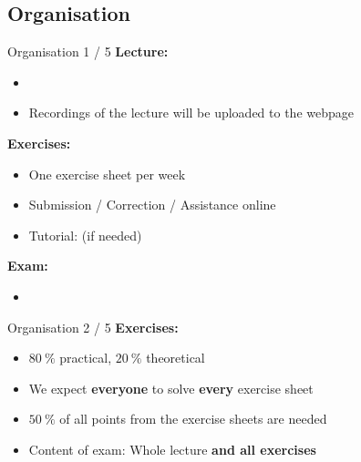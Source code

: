 \subsection{Organisation}

\begin{frame}{Organisation 1 / 5}
  \textbf{Lecture:}
  \begin{itemize}
    \item
      {\color{MainB}\LectureOrganisationLecture}
    \item
      Recordings of the lecture will be uploaded to the webpage
  \end{itemize}
  \textbf{Exercises:}
  \begin{itemize}
    \item
      One exercise sheet per week
    \item
      Submission / Correction / Assistance online
    \item
      Tutorial: (if needed)\\
      {\color{MainB}\LectureOrganisationHelp}
  \end{itemize}
  \textbf{Exam:}\\
  \begin{itemize}
    \item
      {\color{MainB}\LectureOrganisationExam}
  \end{itemize}
\end{frame}


\begin{frame}{Organisation 2 / 5}
  \textbf{Exercises:}
  \begin{itemize}
    \item
      {\color{MainA}$\SI{80}{\percent}$} practical,
      {\color{MainA}$\SI{20}{\percent}$} theoretical
    \item<2- |handout:1>
      We expect \textbf{everyone} to solve \textbf{every} exercise sheet
  \end{itemize}
  \begin{itemize}
    \item<4- |handout:1>
      {\color{MainA}$\SI{50}{\percent}$} of all points from
      the exercise sheets are needed
    \item<5- |handout:1>
      Content of exam: Whole lecture \textbf{and all exercises}
  \end{itemize}
\end{frame}


